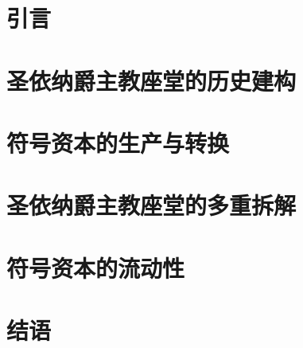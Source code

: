 \documentclass[
    lang=cn,
]{spArticle}
\date{}
\begin{document}
    \section{引言}
    

    \section{圣依纳爵主教座堂的历史建构}
    \lipsum[2]

    \section{符号资本的生产与转换}
    \lipsum[3]

    \section{圣依纳爵主教座堂的多重拆解}
    \lipsum[4]

    \section{符号资本的流动性}
    \lipsum[5]

    \section{结语}
    \lipsum[6]
\end{document}
